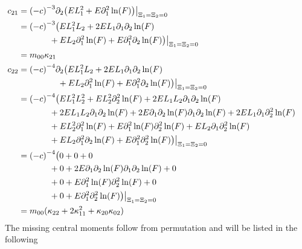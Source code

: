 \documentclass{article}
\begin{document}
\begin{align*}
  &\begin{aligned}
  \nonumber
    \mathllap{c_{21}} & = {(-c)}^{-3} \partial_2 \big(EL_1^2 + E \partial_1^2\ln(F)\big)  \bigr|_{\Xi_1=\Xi_2 = 0} \\
    & = {(-c)}^{-3} \big( E L_1^2 L_2 + 2EL_1\partial_1\partial_2\ln(F) \\
      &\qquad\quad\ \ + EL_2 \partial_1^2\ln(F) + E \partial_1^2\partial_2\ln(F) \big)  \bigr|_{\Xi_1=\Xi_2 = 0} \\
    & = m_{00}\kappa_{21}
  \end{aligned}\\
  &\begin{aligned}
  \nonumber
    \mathllap{c_{22}} & = {(-c)}^{-4} \partial_2 \big( E L_1^2 L_2 + 2EL_1\partial_1\partial_2\ln(F) \\
      &\qquad\qquad\ \ + EL_2 \partial_1^2\ln(F) + E \partial_1^2\partial_2\ln(F) \big)  \bigr|_{\Xi_1=\Xi_2 = 0} \\
    & = {(-c)}^{-4} \big(
      E L_1^2 L_2^2 + E L_2^2 \partial_2^2\ln(F) + 2 E L_1 L_2 \partial_1\partial_2 \ln(F) \\
    & \qquad\quad\ \ +
      2 E L_1 L_2 \partial_1\partial_2 \ln(F) + 2 E \partial_1\partial_2 \ln(F) \partial_1\partial_2 \ln(F) + 2 E L_1 \partial_1\partial_2^2 \ln(F) \\
    & \qquad\quad\ \ +
      E L_2^2 \partial_1^2 \ln(F) + E \partial_1^2 \ln(F) \partial_2^2 \ln(F) + E L_2 \partial_1\partial_2^2 \ln(F) \\
    & \qquad\quad\ \ +
      E L_2 \partial_1^2 \partial_2 \ln(F) + E\partial_1^2\partial_2^2 \ln(F)
      \big) \bigr|_{\Xi_1=\Xi_2 = 0} \\
    & = {(-c)}^{-4} \big(
    0 + 0 + 0 \\
    & \qquad\quad\ \ +
      0 + 2 E \partial_1\partial_2 \ln(F) \partial_1\partial_2 \ln(F) + 0 \\
    & \qquad\quad\ \ +
      0 + E \partial_1^2 \ln(F) \partial_2^2 \ln(F) + 0 \\
    & \qquad\quad\ \ +
      0 + E\partial_1^2\partial_2^2 \ln(F)
      \big) \bigr|_{\Xi_1=\Xi_2 = 0} \\
    & = m_{00}(\kappa_{22} + 2\kappa_{11}^2 + \kappa_{20}\kappa_{02})
  \end{aligned}
\end{align*}
The missing central moments follow from permutation and will be listed in the following
\end{document}
